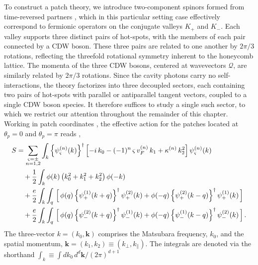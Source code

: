 To construct a patch theory, we introduce two-component spinors formed 
from time-reversed partners \cite{Lee-Dalid, ips-uv-ir1}, which in this particular setting
case effectively correspond to fermionic operators on the conjugate 
valleys $K_+$ and $K_-$. Each valley supports three distinct pairs of 
hot-spots, with the members of each pair connected by a CDW boson. 
These three pairs are related to one another by $2\pi/3$ rotations, 
reflecting the threefold rotational symmetry inherent to the honeycomb 
lattice. The momenta of the three CDW bosons, centered at wavevectors 
$\boldsymbol{\mathcal{Q}}$, are similarly related by $2\pi/3$ rotations. 
Since the cavity photons carry no self-interactions, the theory 
factorizes into three decoupled sectors, each containing two pairs of 
hot-spots with parallel or antiparallel tangent vectors, coupled to a 
single CDW boson species. It therefore suffices to study a single such 
sector, to which we restrict our attention throughout the remainder of 
this chapter. Working in patch coordinates \cite{Lee-Dalid, ips-uv-ir1, 
ips-u1, ips-rafael, ips-fflo, ips-2kf}, the effective action for the 
patches located at $\theta_p = 0$ and $\theta_p = \pi$ reads 
\cite{ips-cavity},
\begin{align}
 S &= \sum_{\substack{ \varsigma = \pm \\ 
n = 1, 2 }  }
 \int_{k} \left \lbrace \psi^{(n)}_{\varsigma } (k) \right  \rbrace^{\dagger}
  \left [ -i\, k_0 -(-1)^n
  \, \varsigma \,v_F^{(n)} \,k_1 
  + \kappa^{(n)} \, k_2^2 \right ] \psi_{\varsigma }^{(n)} (k) 
\nonumber \\ &	\quad +
\frac{1} {2}	\int_k \phi(k) \left( k_0^2 + k_1^2 + k_2^2 \right) \phi(-k) \nonumber \\
& \quad + \frac{e} {2}  \int_k  \int_q \,
\Big[ \,\phi(q) \left \lbrace 
\psi^{(1)}_{+ } (k+q) \right \rbrace^{\dagger} 
\psi^{(2)}_{+ }(k) 
+ \phi (-q) \left \lbrace 
\psi^{(2)}_{+ } (k-q) \right \rbrace^{\dagger} 
\psi^{(1)}_{+ }(k) 
\,\Big] \nonumber \\
& \quad + \frac{ e} {2}  \int_k  \int_q \,
\Big[ \,\phi (q) \left \lbrace 
\psi^{(2)}_{- } (k+q) \right \rbrace^{\dagger} 
\psi^{(1)}_{- }(k) 
+ \phi (-q) \left \lbrace 
\psi^{(1)}_{- } (k-q) \right \rbrace^{\dagger} 
\psi^{(2)}_{- }(k) 
\,\Big]\,.
\label{eqs0}
\end{align}
The three-vector $k = (k_0, \boldsymbol{k})$ comprises the Matsubara 
frequency, $k_0$, and the spatial momentum, 
$\boldsymbol{k} = (k_1, k_2) \equiv (k_\perp, k_\parallel)$. The integrals are denoted via the 
shorthand $\int_k \equiv \int dk_0\,d^d\boldsymbol{k}/(2\pi)^{d+1}$ 
